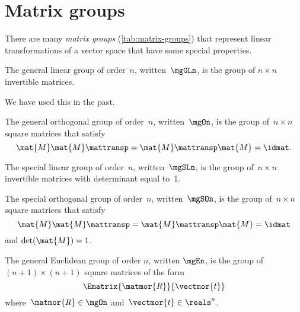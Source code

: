 
\section{Matrix groups}


There are many \emph{matrix groups} (\cref{tab:matrix-groups}) that represent linear transformations of a vector space that have some special properties.

\begin{definition}\label{def:general-linear-group}
The general linear group of order~$n$, written~$\mgGLn$, is the group of $n\times n$ invertible matrices.
\end{definition}

We have used this in the past.

\begin{definition}\label{def:general-orthogonal-group}
The general orthogonal group of order~$n$, written~$\mgOn$, is the group of~$n\times n$ square matrices that satisfy
\begin{equation}
\mat{M} \mat{M}\mattransp = \mat{M}\mattransp \mat{M} = \idmat.
\end{equation}
\end{definition}


\begin{definition}\label{def:special-linear-group}
  The special linear group of order~$n$, written~$\mgSLn$, is the group of~$n\times n$ invertible matrices with determinant equal to~1.
  \end{definition}
\begin{definition}\label{def:special-orthogonal-group}
  The special orthogonal group of order~$n$, written~$\mgSOn$, is the group of~$n\times n$ square matrices that satisfy
  \begin{equation}
  \mat{M} \mat{M}\mattransp = \mat{M}\mattransp \mat{M} = \idmat
  \end{equation}
  and $\det(\mat{M}) = 1$.
  \end{definition}

\begin{definition}\label{def:general-euclidean-group}
The general Euclidean group of order $n$, written $\mgEn$, is the group of $(n+1)\times (n+1)$ square matrices of the form
\begin{equation}\label{eq:En-def}
\Ematrix{\matmor{R}}{\vectmor{t}}
\end{equation}
where~$\matmor{R}\in \mgOn$ and~$\vectmor{t} \in \reals^n$.
\end{definition}


